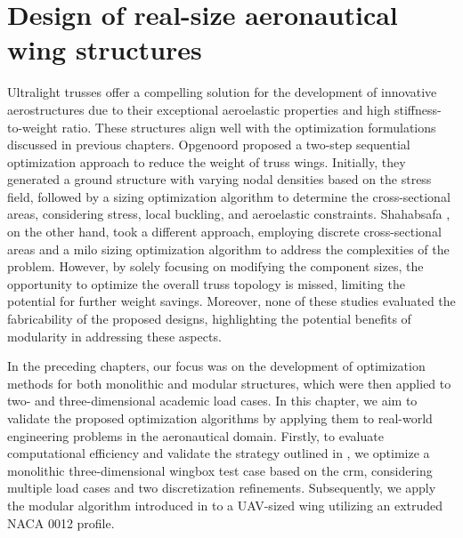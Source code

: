 \setchapterpreamble[u]{\margintoc}
\glsresetall %

\chapter{Design of real-size aeronautical wing structures} \label{chap:07}

Ultralight trusses offer a compelling solution for the development of innovative aerostructures due to their exceptional aeroelastic properties and high stiffness-to-weight ratio. These structures align well with the optimization formulations discussed in previous chapters. Opgenoord  proposed a two-step sequential optimization approach to reduce the weight of truss wings. Initially, they generated a ground structure with varying nodal densities based on the stress field, followed by a sizing optimization algorithm to determine the cross-sectional areas, considering stress, local buckling, and aeroelastic constraints. Shahabsafa , on the other hand, took a different approach, employing discrete cross-sectional areas and a \gls{milo} sizing optimization algorithm to address the complexities of the problem. However, by solely focusing on modifying the component sizes, the opportunity to optimize the overall truss topology is missed, limiting the potential for further weight savings. Moreover, none of these studies evaluated the fabricability of the proposed designs, highlighting the potential benefits of modularity in addressing these aspects.

In the preceding chapters, our focus was on the development of optimization methods for both monolithic and modular structures, which were then applied to two- and three-dimensional academic load cases. In this chapter, we aim to validate the proposed optimization algorithms by applying them to real-world engineering problems in the aeronautical domain. Firstly, to evaluate computational efficiency and validate the strategy outlined in , we optimize a monolithic three-dimensional wingbox test case based on the \gls{crm}, considering multiple load cases and two discretization refinements. Subsequently, we apply the modular algorithm introduced in  to a UAV-sized wing utilizing an extruded NACA 0012 profile.


